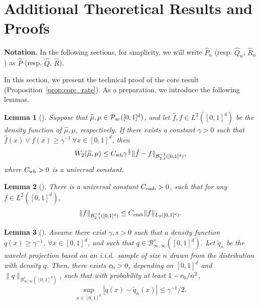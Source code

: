 \documentclass{article}
\theoremstyle{plain}
\newtheorem{lemma}{Lemma}[section]
\theoremstyle{definition}
\def\calB{\mathcal{B}}
\def\calP{\mathcal{P}}
\theoremstyle{plain}
\def\calB{\mathcal{B}}
\def\calP{\mathcal{P}}
\begin{document}
\section{Additional Theoretical Results and Proofs}\label{sec:tech}
\textbf{Notation.} In the following sections, for simplicity, we will write $\widehat P_n$ (resp. $\widehat Q_n$, $\widehat R_{n}$) as $\widehat P$ (resp. $\widehat Q$, $\widehat R$). 

In this section, we present the technical proof of the core result (Proposition~\ref{prop:core_rate}). As a preparation, we introduce the following lemmas.
\begin{lemma}[{\cite[Theorem 4]{niles2022minimax}}]\label{prop:measure.and.density}
    Suppose that $\widehat \mu, \mu \in \calP_{\textup{ac}}([0,1]^d)$, and let $\hat f, f \in L^2([0,1]^d)$ be the density function of $\widehat \mu, \mu$, respectively. If there exists a constant $\gamma >0$ such that $\hat{f}(x)\vee f(x) \geq \gamma^{-1}\,\forall x\in[0,1]^d$, then 
    \begin{align*}\label{eq:Wass_B21}
        W_2(\widehat \mu, \mu) \leq C_{\textup{wb}} \gamma^{\frac{1}{2}}  \|\hat f - f\|_{\calB_{2,1}^{-1}([0,1]^d)},
    \end{align*}
    where $C_{\textup{wb}}>0$ is a universal constant.
\end{lemma}

\begin{lemma}[{\cite[Section 6.10, Proposition 7]{meyer1992wavelets}}]\label{lem:wavelet_oper}
    There is a universal constant $C_{\textup{emb}} > 0$, such that for any $f \in L^2([0,1]^d)$, 
    \begin{align*}
        \|f\|_{\calB_{2,1}^{-1}([0,1]^d)} \leq C_{\textup{emb}} \|f\|_{L_2([0,1]^d)}.
    \end{align*}
\end{lemma}

\begin{lemma}[{\cite[Lemma 29]{manole2024plugin}}]\label{lem:density_bound}
    Assume there exist $\gamma, s > 0$ such that a density function
    $q(x) \ge \gamma^{-1}$, $\forall x \in [0,1]^d$, and such that
    $q \in \mathcal{B}^{s}_{\infty,\infty}([0,1]^d)$. Let $\tilde q_n$ be the wavelet projection based on an i.i.d.~sample of size $n$
    drawn from the distribution with density $q$.
    Then, there exists $c_{\textup{b}} > 0$, depending on $[0,1]^d$ and
    $\|q\|_{\mathcal{B}^{s}_{\infty,\infty}([0,1]^d)}$, such that with probability at least
    $1 - c_{\textup{b}}/n^2$, 
    \[
        \sup_{x \in [0,1]^d} |q(x) - \tilde q_n(x)| \leq \gamma^{-1}/2.
    \]
\end{lemma}
\end{document}
